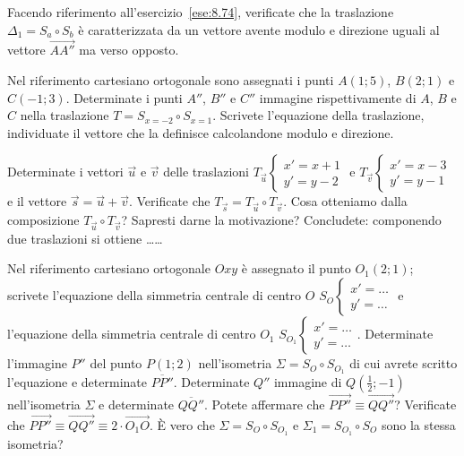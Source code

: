 \begin{esercizio}
\label{ese:8.75} %
Facendo riferimento all'esercizio~\ref{ese:8.74}, verificate che la 
traslazione $\Delta_1 = S_a \circ S_b$ è caratterizzata da un vettore 
avente modulo e direzione uguali al vettore $\overrightarrow{AA''}$ 
ma verso opposto.
\end{esercizio}

\begin{esercizio}
\label{ese:8.76} %
Nel riferimento cartesiano ortogonale sono assegnati i punti 
$A(1;5)$, $B(2;1)$ e $C(-1;3)$. Determinate i punti $A''$, $B''$ e 
$C''$ immagine rispettivamente di $A$, $B$ e $C$ nella traslazione 
$T=S_{x=-2} \circ S_{x=1}$. Scrivete l'equazione della traslazione, 
individuate il vettore che la definisce calcolandone modulo e 
direzione.
\end{esercizio}

\begin{esercizio}
\label{ese:8.77} %
Determinate i vettori $\vec{u}$ e $\vec{v}$ delle traslazioni 
$T_{\vec{u}}\begin{cases}x'=x+1\\y'=y-2\end{cases}$ e 
$T_{\vec{v}}\begin{cases}x'=x-3\\y'=y-1\end{cases}$ e il vettore 
$\vec{s} = \vec{u} + \vec{v}$. Verificate che $T_{\vec{s}} = 
T_{\vec{u}} \circ T_{\vec{v}}$.
Cosa otteniamo dalla composizione $T_{\vec{u}} \circ T_{\vec{v}}$? 
Sapresti darne la motivazione?
Concludete: componendo due traslazioni si ottiene \ldots\ldots{}
\end{esercizio}

\begin{esercizio}
\label{ese:8.78} %
Nel riferimento cartesiano ortogonale $Oxy$ è assegnato il punto 
$O_1(2;1)$; scrivete l'equazione della simmetria centrale di centro 
$O$ $S_O\begin{cases}x'=\ldots{}\\y'=\ldots{}\end{cases}$  e 
l'equazione della simmetria centrale di centro $O_1$ 
$S_{O_1}\begin{cases}x'=\ldots{}\\y'=\ldots{}\end{cases}$. 
Determinate l'immagine $P''$ del punto $P(1;2)$ nell'isometria 
$\Sigma=S_O \circ S_{O_1}$ di cui avrete scritto l'equazione e 
determinate $\overline{PP''}$. Determinate $Q''$ immagine di 
$Q\left(\frac{1}{2};-1\right)$ nell'isometria $\Sigma$ e determinate 
$\overline{QQ''}$. Potete affermare che $\overrightarrow{PP''} \equiv 
\overrightarrow{QQ''}$? Verificate che $\overrightarrow{PP''} \equiv 
\overrightarrow{QQ''} \equiv 2\cdot \overrightarrow{O_1O}$.
\`E vero che $\Sigma=S_O \circ S_{O_1}$ e $\Sigma_1=S_{O_1} \circ 
S_{O}$ sono la stessa isometria?
\end{esercizio}

